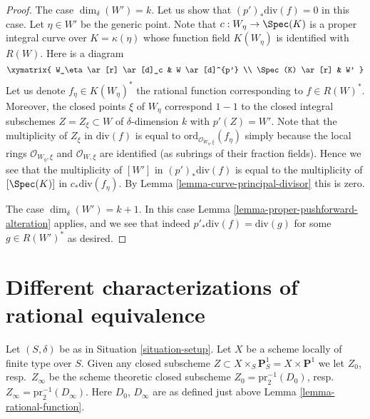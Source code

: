 \begin{proof}
\medskip\noindent
The case $\dim_\delta(W') = k$. Let us show that $(p')_*\text{div}(f) = 0$
in this case. Let $\eta \in W'$ be the generic point.
Note that $c : W_\eta \to \Spec(K)$
is a proper integral curve over $K = \kappa(\eta)$
whose function field $K(W_\eta)$ is identified with $R(W)$.
Here is a diagram
$$
\xymatrix{
W_\eta \ar[r] \ar[d]_c & W \ar[d]^{p'} \\
\Spec(K) \ar[r] & W'
}
$$
Let us denote $f_\eta \in K(W_\eta)^*$ the rational function
corresponding to $f \in R(W)^*$.
Moreover, the closed points $\xi$ of $W_\eta$ correspond $1 - 1$ to the
closed integral subschemes $Z = Z_\xi \subset W$ of $\delta$-dimension $k$
with $p'(Z) = W'$. Note that the multiplicity
of $Z_\xi$ in $\text{div}(f)$ is equal to
$\text{ord}_{\mathcal{O}_{W_\eta, \xi}}(f_\eta)$ simply because the
local rings $\mathcal{O}_{W_\eta, \xi}$ and $\mathcal{O}_{W, \xi}$
are identified (as subrings of their fraction fields).
Hence we see that the multiplicity of $[W']$ in
$(p')_*\text{div}(f)$ is equal to the multiplicity of
$[\Spec(K)]$ in $c_*\text{div}(f_\eta)$.
By Lemma \ref{lemma-curve-principal-divisor} this is zero.

\medskip\noindent
The case $\dim_\delta(W') = k + 1$. In this case
Lemma \ref{lemma-proper-pushforward-alteration} applies,
and we see that indeed $p'_*\text{div}(f) = \text{div}(g)$
for some $g \in R(W')^*$ as desired.
\end{proof}















\section{Different characterizations of rational equivalence}
\label{section-different-rational-equivalence}

\noindent
Let $(S, \delta)$ be as in Situation \ref{situation-setup}.
Let $X$ be a scheme locally of finite type over $S$.
Given any closed subscheme
$Z \subset X \times_S \mathbf{P}^1_S = X \times \mathbf{P}^1$
we let $Z_0$, resp.\ $Z_\infty$ be the scheme theoretic closed
subscheme $Z_0 = \text{pr}_2^{-1}(D_0)$,
resp.\ $Z_\infty = \text{pr}_2^{-1}(D_\infty)$.
Here $D_0$, $D_\infty$ are as defined just above
Lemma \ref{lemma-rational-function}.

